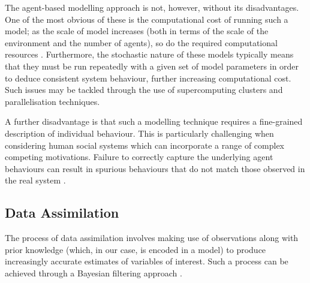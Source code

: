 The agent-based modelling approach is not, however, without its disadvantages.
One of the most obvious of these is the computational cost of running such a
model; as the scale of model increases (both in terms of the scale of the
environment and the number of agents), so do the required computational
resources \citep{bonabeau2002agent}.
Furthermore, the stochastic nature of these models typically means that they
must be run repeatedly with a given set of model parameters in order to deduce
consistent system behaviour, further increasing computational cost.
Such issues may be tackled through the use of supercomputing clusters and
parallelisation techniques.

A further disadvantage is that such a modelling technique requires a
fine-grained description of individual behaviour.
This is particularly challenging when considering human social systems which can
incorporate a range of complex competing motivations.
Failure to correctly capture the underlying agent behaviours can result in
spurious behaviours that do not match those observed in the real system
\citep{couclelis2002modeling}.

\subsection{Data Assimilation}\label{sub:lit_rev:da}


The process of data assimilation involves making use of observations along with
prior knowledge (which, in our case, is encoded in a model) to produce
increasingly accurate estimates of variables of interest.
Such a process can be achieved through a Bayesian filtering approach
\citep{jazwinski1970mathematics, bar2004estimation}.

